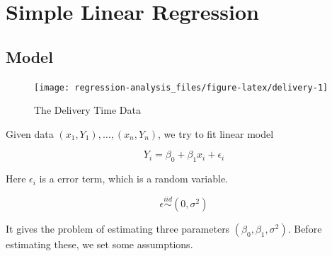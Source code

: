 \documentclass[]{book}
\newenvironment{Shaded}{\begin{snugshade}}{\end{snugshade}}
\newcommand{\DataTypeTok}[1]{\textcolor[rgb]{0.13,0.29,0.53}{#1}}
\newcommand{\FloatTok}[1]{\textcolor[rgb]{0.00,0.00,0.81}{#1}}
\newcommand{\KeywordTok}[1]{\textcolor[rgb]{0.13,0.29,0.53}{\textbf{#1}}}
\newcommand{\NormalTok}[1]{#1}
\newcommand{\OperatorTok}[1]{\textcolor[rgb]{0.81,0.36,0.00}{\textbf{#1}}}
\newcommand{\StringTok}[1]{\textcolor[rgb]{0.31,0.60,0.02}{#1}}
\theoremstyle{definition}
\theoremstyle{definition}
\theoremstyle{definition}
\theoremstyle{remark}
\begin{document}
\hypertarget{simple}{%
\chapter{Simple Linear Regression}\label{simple}}

\hypertarget{model}{%
\section{Model}\label{model}}

\begin{Shaded}
\end{Shaded}

\begin{Shaded}
\end{Shaded}

\begin{figure}[H]

{\centering \texttt{[image: regression-analysis\_files/figure-latex/delivery-1]} 

}

\caption{The Delivery Time Data}\label{fig:delivery}
\end{figure}

Given data \((x_1, Y_1), \ldots, (x_n, Y_n)\), we try to fit linear model

\[Y_i = \beta_0 + \beta_1 x_i + \epsilon_i\]

Here \(\epsilon_i\) is a error term, which is a random variable.

\[\epsilon \stackrel{iid}{\sim} (0, \sigma^2)\]

It gives the problem of estimating three parameters \((\beta_0, \beta_1, \sigma^2)\). Before estimating these, we set some assumptions.
\end{document}

